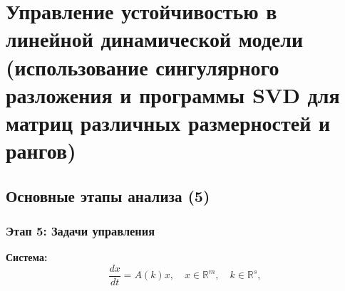 	\newpage
	
	\section{Управление устойчивостью в линейной динамической модели (использование сингулярного разложения и программы  SVD для матриц различных размерностей и рангов)}
	\subsection{Основные этапы анализа (5)}
	\subsubsection{Этап 5: Задачи управления}
	\textbf{Система:}
	\begin{equation}
		\frac{d x}{d t} = A(k)x, \quad x \in \mathbb{R}^m, \quad k \in \mathbb{R}^s,
	\end{equation}
